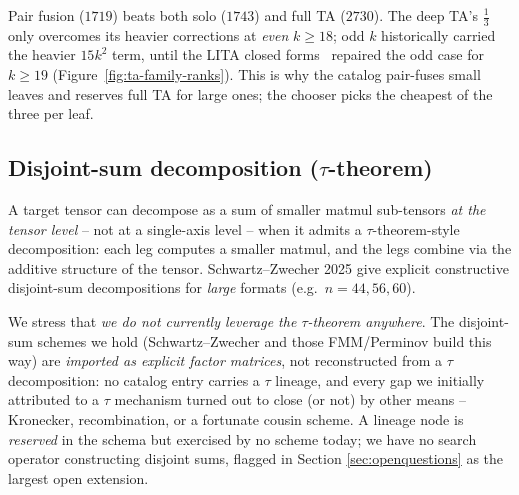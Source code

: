 \noindent Pair fusion (\(1719\)) beats both solo (\(1743\)) and full TA (\(2730\)). The
deep TA's \(\tfrac{1}{3}\) only overcomes its heavier corrections at \emph{even}
\(k \ge 18\); odd \(k\) historically carried the heavier \(15k^2\) term, until the LITA
closed forms~\cite{khoruzhii2026lita} repaired the odd case for \(k \ge 19\)
(Figure~\ref{fig:ta-family-ranks}). This is why the catalog pair-fuses small leaves and
reserves full TA for large ones; the chooser picks the cheapest of the three per leaf.

\subsection{Disjoint-sum decomposition ($\tau$-theorem)}
\label{ssec:disjoint-sum}

A target tensor can decompose as a sum of smaller matmul sub-tensors \emph{at the tensor
level} -- not at a single-axis level -- when it admits a $\tau$-theorem-style
decomposition: each leg computes a smaller matmul, and the legs combine via the additive
structure of the tensor. Schwartz--Zwecher 2025 \cite{schwartzzwecher2025} give explicit
constructive disjoint-sum decompositions for \emph{large} formats (e.g.\
\(n = 44, 56, 60\)).

We stress that \emph{we do not currently leverage the $\tau$-theorem anywhere}. The
disjoint-sum schemes we hold (Schwartz--Zwecher and those FMM/Perminov build this way) are
\emph{imported as explicit factor matrices}, not reconstructed from a $\tau$ decomposition:
no catalog entry carries a $\tau$ lineage, and every gap we initially attributed to a
$\tau$ mechanism turned out to close (or not) by other means -- Kronecker, recombination,
or a fortunate cousin scheme. A \code{DisjointSum} lineage node is \emph{reserved} in the
schema but exercised by no scheme today; we have no search operator constructing disjoint
sums, flagged in Section \ref{sec:openquestions} as the largest open extension.
